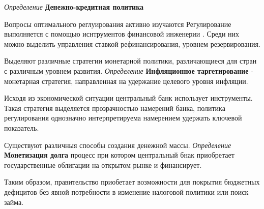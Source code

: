 
\textit{Определение} \textbf{Денежно-кредитная политика } 

Вопросы оптимального реглуирования активно изучаются \cite{нэш2008идеальные}
Регулирование выполняется с помощью иснтрументов финансовой инженерии \cite{архипов2007предпосылки}. Среди них можно выделить управления ставкой рефинансирования, уровнем резервирования. 



Выделяют различные стратегии монетарной политики, различающиеся для стран с различным уровнем развития. 
\textit{Определение} \textbf{Инфляционное таргетирование} \cite{bernanke1997inflation} - монетарная стратегия, направленная на удержание целевого уровня инфляции. 

Исходя из экономической ситуации центральный банк использует инструменты. Такая стратегия выделяется прозрачностью намерений банка, политика регулирования однозначно интерпретируема намерением удержать ключевой показатель.

Существуют различныя способы создания денежной массы.
\textit{Определение} \textbf{Монетизация долга} процесс при котором центральный бнак приобретает государственные облигации на открытом рынке и финансирует. 

Таким образом, правительство приобетает возможности для покрытия бюджетных дефицитов без явной потребности в изменение налоговой политики или поиск займа.

